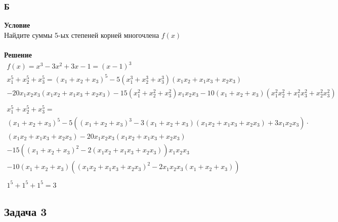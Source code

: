 	\subsubsection*{\textbf{Б}}
	\textbf{Условие}\\
	Найдите суммы 5-ых степеней корней многочлена $f(x)$\\
	\\
	\textbf{Решение}\\
	\begin{gather*}
		f(x) = x^3 - 3x^2 + 3x - 1 = (x-1)^{3}\\
		x_1^5 + x_2^5 + x_3^5 = (x_1 + x_2 + x_3)^5 - 5(x_1^3 + x_2^3 + x_3^3)(x_1x_2 + x_1x_3 + x_2x_3)\\
		- 20x_1x_2x_3(x_1x_2 + x_1x_3 + x_2x_3) - 15(x_1^2 + x_2^2 + x_3^2)x_1x_2x_3 -10(x_1 + x_2 + x_3)(x_1^2 x_2^2 + x_1^2 x_3^2 + x_2^2 x_3^2)\\
		\\
		x_1^5 + x_2^5 + x_3^5 =\\
		(x_1 + x_2 + x_3)^5 - 5((x_1 + x_2 + x_3)^3 - 3(x_1+x_2+x_3)(x_1x_2+x_1x_3+x_2x_3) + 3x_1x_2x_3) \cdot \\
		(x_1x_2 + x_1x_3 + x_2x_3) - 20x_1x_2x_3(x_1x_2 + x_1x_3 + x_2x_3)\\
		- 15((x_1 + x_2 + x_3)^2 - 2(x_1 x_2 + x_1 x_3 + x_2 x_3))x_1x_2x_3\\
		- 10(x_1 + x_2 + x_3)((x_1x_2 + x_1x_3 + x_2x_3)^2 - 2x_1x_2x_3(x_1+x_2+x_3))\\
		\\
		1^5 + 1^5 + 1^5 = 3
	\end{gather*}
	
	\newpage
	\subsection*{\textbf{Задача 3}}
